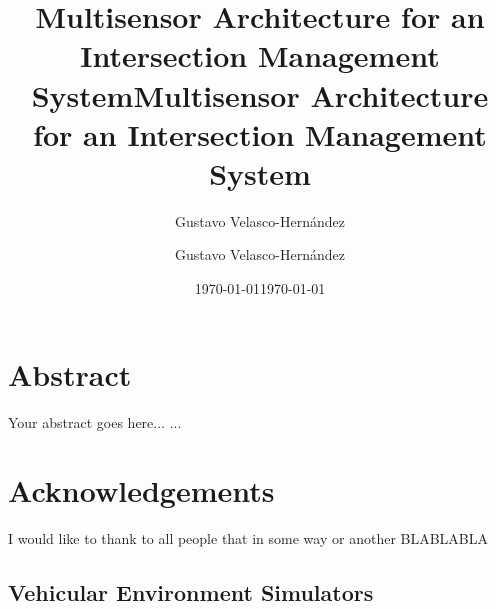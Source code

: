 \documentclass{book}
\begin{document}
\title{Multisensor Architecture for an Intersection Management System}
\vfill
\vfill
\vfill
\author{Gustavo Velasco-Hernández}
\vfill
\vfill
\vfill
\date{\today}
\maketitle

\title{Multisensor Architecture for an Intersection Management System}
\vfill
\vfill
\vfill
\author{Gustavo Velasco-Hernández}
\vfill
\vfill
\vfill
\date{\today}
\maketitle

\chapter*{Abstract}
Your abstract goes here...
...


\chapter*{Acknowledgements}%
%

I would like to thank to all people that in some way or another BLABLABLA


\tableofcontents
\setcounter{tocdepth}{3}

\listoffigures

\listoftables











\begin{appendices}
	\chapter {Vehicular Environment Simulators}
	
\end{appendices}



%
\end{document}
